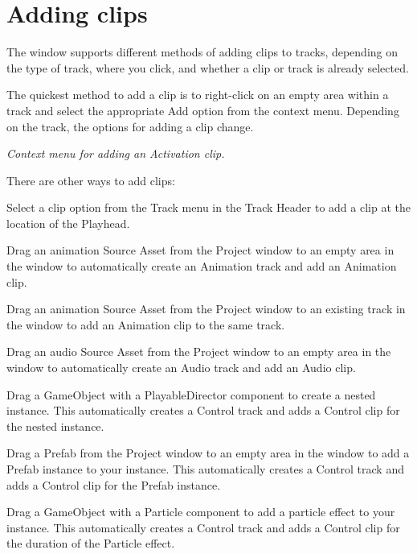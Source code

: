 \chapter{Adding clips}
\hypertarget{md__library_2_package_cache_2com_8unity_8timeline_0d1_87_86_2_documentation_0i_2clp__add}{}\label{md__library_2_package_cache_2com_8unity_8timeline_0d1_87_86_2_documentation_0i_2clp__add}
\label{md__library_2_package_cache_2com_8unity_8timeline_0d1_87_86_2_documentation_0i_2clp__add_autotoc_md1108}%
%
 The  window supports different methods of adding clips to tracks, depending on the type of track, where you click, and whether a clip or track is already selected.

The quickest method to add a clip is to right-\/click on an empty area within a track and select the appropriate Add option from the context menu. Depending on the track, the options for adding a clip change.



{\itshape Context menu for adding an Activation clip.}

There are other ways to add clips\+:


\begin{DoxyItemize}
\item Select a clip option from the Track menu in the Track Header to add a clip at the location of the  Playhead.
\item Drag an animation Source Asset from the Project window to an empty area in the  window to automatically create an Animation track and add an Animation clip.
\item Drag an animation Source Asset from the Project window to an existing track in the  window to add an Animation clip to the same track.
\item Drag an audio Source Asset from the Project window to an empty area in the  window to automatically create an Audio track and add an Audio clip.
\item Drag a Game\+Object with a Playable\+Director component to create a nested  instance. This automatically creates a Control track and adds a Control clip for the nested  instance.
\item Drag a Prefab from the Project window to an empty area in the  window to add a Prefab instance to your  instance. This automatically creates a Control track and adds a Control clip for the Prefab instance.
\item Drag a Game\+Object with a Particle component to add a particle effect to your  instance. This automatically creates a Control track and adds a Control clip for the duration of the Particle effect.
\end{DoxyItemize}

